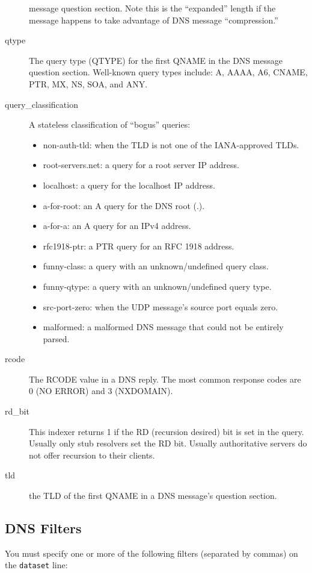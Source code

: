 \documentclass{report}
\begin{document}
\begin{description}
	message question section.  Note this is the ``expanded''
	length if the message happens to take advantage of DNS
	message ``compression.''
\item[qtype]
	The query type (QTYPE) for the first QNAME in the DNS message
	question section.  Well-known query types include: A, AAAA,
	A6, CNAME, PTR, MX, NS, SOA, and ANY.
\item[query\_classification]
	A stateless classification of ``bogus'' queries:
	\begin{itemize}
	\setlength{\itemsep}{0ex plus 0.5ex minus 0.0ex}
	\item non-auth-tld: when the TLD is not one of the IANA-approved TLDs.
	\item root-servers.net: a query for a root server IP address.
	\item localhost: a query for the localhost IP address.
	\item a-for-root: an A query for the DNS root (.).
	\item a-for-a: an A query for an IPv4 address.
	\item rfc1918-ptr: a PTR query for an RFC 1918 address.
	\item funny-class: a query with an unknown/undefined query class.
	\item funny-qtype: a query with an unknown/undefined query type.
	\item src-port-zero: when the UDP message's source port equals zero.
	\item malformed: a malformed DNS message that could not be entirely parsed.
	\end{itemize}
\item[rcode]
	The RCODE value in a DNS reply.  The most common response
	codes are 0 (NO ERROR) and 3 (NXDOMAIN). 
\item[rd\_bit]
	This indexer returns 1 if the RD (recursion desired) bit is
	set in the query.  Usually only stub resolvers set the RD bit.
	Usually authoritative servers do not offer recursion to their
	clients.
\item[tld]
	the TLD of the first QNAME in a DNS message's question section.
\end{description}

\subsection{DNS Filters}

You must specify one or more of the following filters (separated by commas) on
the {\tt dataset\/} line:
\end{document}
